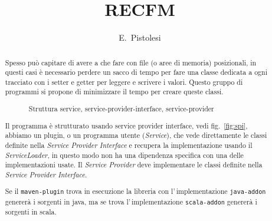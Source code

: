 \documentclass[a4paper,10pt]{report}
\title{RECFM}
\author{E.~Pistolesi}
\begin{document}
\maketitle

\begin{abstract}
Spesso può capitare di avere a che fare con file (o aree di memoria)
posizionali, in questi casi è necessario perdere un sacco di tempo per fare una
classe dedicata a ogni tracciato con i setter e getter per leggere e scrivere
i valori. 
Questo gruppo di programmi si propone di minimizzare il tempo per creare queste
classi.

\begin{figure}[!htb]
\centering
{}
\caption{Struttura service, service-provider-interface, service-provider} 
\label{fig:spi}
\end{figure}

Il programma è strutturato usando service provider interface, 
vedi fig.~\ref{fig:spi}, abbiamo un plugin, o un programma utente 
(\textsl{Service}), che vede direttamente le classi definite nella 
\textsl{Service Provider Interface} e recupera la implementazione usando il 
\textsl{ServiceLoader}, in questo modo non ha una dipendenza specifica con una
delle implementazioni usate. 
Il \textsl{Service Provider} deve implementare le classi definite nella 
\textsl{Service Provider Interface}.

Se il \verb!maven-plugin! trova in esecuzione la libreria con 
l'\,implementazione \verb!java-addon! genererà i sorgenti in java, ma se trova
l'\,implementazione \verb!scala-addon! genererà i sorgenti in scala.
\end{abstract}
\end{document}
